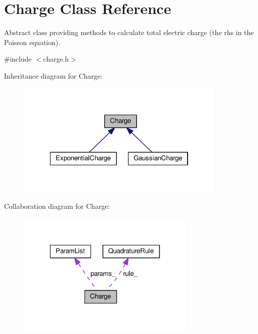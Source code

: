 \hypertarget{classCharge}{\section{Charge Class Reference}
\label{classCharge}
}


Abstract class providing methods to calculate total electric charge (the rhs in the Poisson equation).  




{\ttfamily \#include $<$charge.\-h$>$}



Inheritance diagram for Charge\-:\nopagebreak
\begin{figure}[H]
\begin{center}
\leavevmode
\includegraphics[width=285pt]{classCharge__inherit__graph}
\end{center}
\end{figure}


Collaboration diagram for Charge\-:\nopagebreak
\begin{figure}[H]
\begin{center}
\leavevmode
\includegraphics[width=243pt]{classCharge__coll__graph}
\end{center}
\end{figure}
